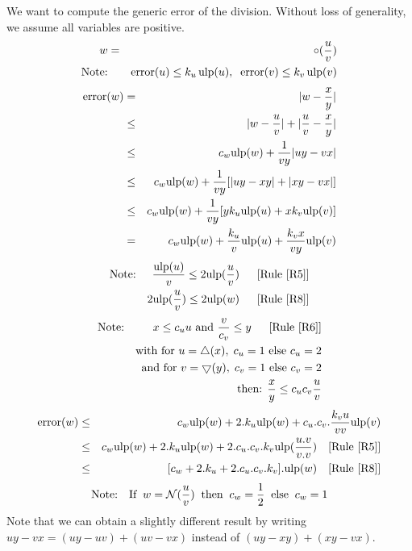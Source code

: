 \documentclass[12pt]{amsart}
\def\n{\textnormal}
\def\pinf{\bigtriangleup}
\def\minf{\bigtriangledown}
\def\ulp{{\rm ulp}}
\def\N{{\mathcal N}}
\newcommand{\U}[1]{\quad \mbox{[Rule~\ref{#1}]}}
\DeclareMathOperator{\error}{error}
\begin{document}
We want to compute the generic error of the division.
Without loss of generality, we assume all variables are positive.
\begin{eqnarray}\nonumber
w&=&\circ(\frac{u}{v}) \\\nonumber
\textnormal{Note:}&& \error(u) \leq k_u \, \ulp(u), \;\; \error(v) \leq k_v \, \ulp(v)
\end{eqnarray}
\begin{eqnarray}\nonumber
\error(w)& = &|w - \frac{x}{y}| \\\nonumber
& \leq &|w - \frac{u}{v}| +|\frac{u}{v} - \frac{x}{y}| \\\nonumber
& \leq & c_w \ulp(w) + \frac{1}{vy}|uy-vx| \\\nonumber
& \leq & c_w \ulp(w) + \frac{1}{vy}[|uy-xy|+|xy-vx| ]\\\nonumber
& \leq & c_w \ulp(w) + \frac{1}{vy}[y k_u \ulp(u)+ x k_v \ulp(v)]\\\nonumber
&   =  & c_w \ulp(w) + \frac{k_u}{v}  \ulp(u)+ \frac{k_v x}{vy} \ulp(v)
\end{eqnarray}
\begin{eqnarray}\nonumber
\textnormal{Note:}&& \frac{\ulp(u)}{v} \leq  2 \ulp(\frac{u}{v}) \;\; \U{R5}\\\nonumber
&& 2 \ulp(\frac{u}{v}) \leq  2 \ulp(w) \;\; \U{R8}
\end{eqnarray}
\begin{eqnarray}\nonumber
\textnormal{Note:}&& x \leq c_u u \textnormal{ and } \frac{v}{c_v} \leq y\;\; \U{R6}\\\nonumber
&&\n{with } \n{for } u=\pinf(x),\;c_u=1 \n{ else } c_u=2\\\nonumber
&&\n{ and }\n{for } v=\minf(y),\;c_v=1 \n{ else } c_v=2\\\nonumber
&& \n{then: } \frac{x}{y} \leq c_u c_v  \frac{u}{v}
\end{eqnarray}
\begin{eqnarray}\nonumber
\error(w)& \leq & c_w \ulp(w) + 2.k_u  \ulp(w)+ c_u.c_v.\frac{k_v u}{vv} \ulp(v)\\\nonumber
& \leq & c_w \ulp(w) + 2.k_u  \ulp(w)+ 2.c_u.c_v.k_v \ulp(\frac{u.v}{v.v}) \U{R5}\\\nonumber
& \leq & [c_w  + 2.k_u+ 2.c_u.c_v.k_v].\ulp(w) \U{R8}
\end{eqnarray}
\begin{eqnarray}\nonumber
\textnormal{Note:}&&\textnormal{If}\;\; w=\N(\frac{u}{v}) \;\;\textnormal{then}\;\; c_w =\frac{1}{2} \;\;\textnormal{else}\;\; c_w =1
\end{eqnarray}
Note that we can obtain a slightly different result by writing
$uy-vx = (uy - uv) + (uv - vx)$ instead of $(uy-xy)+(xy-vx)$.
\end{document}
